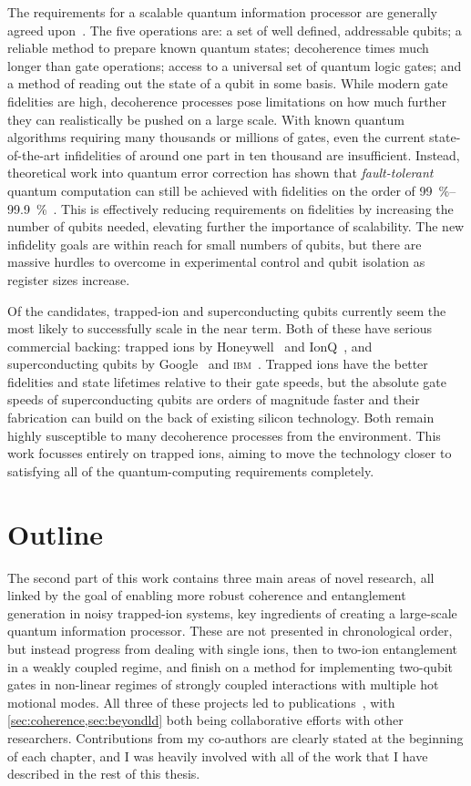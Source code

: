 The requirements for a scalable quantum information processor are generally agreed upon~\cite{DiVincenzo2000}.
The five operations are: a set of well defined, addressable qubits; a reliable method to prepare known quantum states; decoherence times much longer than gate operations; access to a universal set of quantum logic gates; and a method of reading out the state of a qubit in some basis.
While modern gate fidelities are high, decoherence processes pose limitations on how much further they can realistically be pushed on a large scale.
With known quantum algorithms requiring many thousands or millions of gates, even the current state-of-the-art infidelities of around one part in ten thousand are insufficient.
Instead, theoretical work into quantum error correction has shown that \emph{fault-tolerant} quantum computation can still be achieved with fidelities on the order of \qtyrange{99}{99.9}{\percent}~\cite{DiVincenzo1996,Roffe2019}.
This is effectively reducing requirements on fidelities by increasing the number of qubits needed, elevating further the importance of scalability.
The new infidelity goals are within reach for small numbers of qubits, but there are massive hurdles to overcome in experimental control and qubit isolation as register sizes increase.

Of the candidates, trapped-ion and superconducting qubits currently seem the most likely to successfully scale in the near term.
Both of these have serious commercial backing: trapped ions by Honeywell~\cite{Pino2021} and IonQ~\cite{Blumel2021}, and superconducting qubits by Google~\cite{Arute2019} and \textsc{ibm}~\cite{Zhang2020}.
Trapped ions have the better fidelities and state lifetimes relative to their gate speeds, but the absolute gate speeds of superconducting qubits are orders of magnitude faster and their fabrication can build on the back of existing silicon technology.
Both remain highly susceptible to many decoherence processes from the environment.
This work focusses entirely on trapped ions, aiming to move the technology closer to satisfying all of the quantum-computing requirements completely.


\section{Outline}

The second part of this work contains three main areas of novel research, all linked by the goal of enabling more robust coherence and entanglement generation in noisy trapped-ion systems, key ingredients of creating a large-scale quantum information processor.
These are not presented in chronological order, but instead progress from dealing with single ions, then to two-ion entanglement in a weakly coupled regime, and finish on a method for implementing two-qubit gates in non-linear regimes of strongly coupled interactions with multiple hot motional modes.
All three of these projects led to publications~\cite{Corfield2021,Sameti2021,Lishman2020}, with \cref{sec:coherence,sec:beyondld} both being collaborative efforts with other researchers.
Contributions from my co-authors are clearly stated at the beginning of each chapter, and I was heavily involved with all of the work that I have described in the rest of this thesis.

